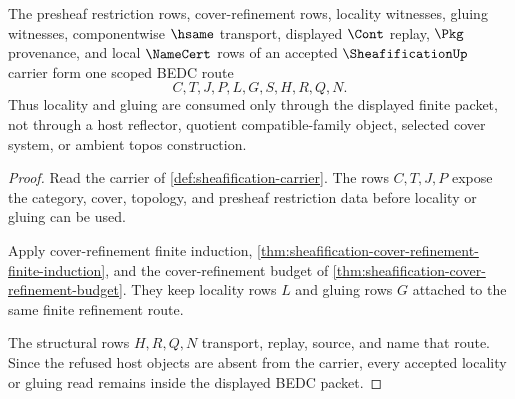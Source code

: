 \begin{theorem}
\label{thm:sheafification-locality-scope-addendum}
The presheaf restriction rows, cover-refinement rows, locality witnesses, gluing witnesses, componentwise $\hsame$ transport, displayed $\Cont$ replay, $\Pkg$ provenance, and local $\NameCert$ rows of an accepted $\SheafificationUp$ carrier form one scoped BEDC route
$$
C,T,J,P,L,G,S,H,R,Q,N.
$$
Thus locality and gluing are consumed only through the displayed finite packet, not through a host reflector, quotient compatible-family object, selected cover system, or ambient topos construction.
\end{theorem}
\begin{proof}
Read the carrier of \autoref{def:sheafification-carrier}. The rows $C,T,J,P$ expose the category, cover, topology, and presheaf restriction data before locality or gluing can be used.

Apply cover-refinement finite induction, \autoref{thm:sheafification-cover-refinement-finite-induction}, and the cover-refinement budget of \autoref{thm:sheafification-cover-refinement-budget}. They keep locality rows $L$ and gluing rows $G$ attached to the same finite refinement route.

The structural rows $H,R,Q,N$ transport, replay, source, and name that route. Since the refused host objects are absent from the carrier, every accepted locality or gluing read remains inside the displayed BEDC packet.
\end{proof}


\begin{closurestatus}{\SheafificationUp}
  \theoryclosure{\obligationClosure}
  \formalstatus{\unformalizedV}
\end{closurestatus}
